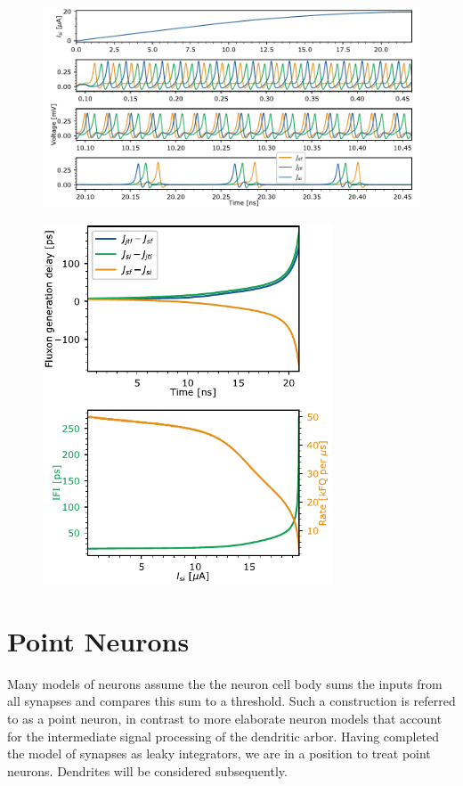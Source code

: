 \documentclass[twocolumn]{article}
\begin{document}
\begin{figure}[htb]
\includegraphics[width=17.2cm]{figures/_03__syn__fq_peaks.pdf}
\end{figure}

\begin{figure}[htb]
\includegraphics[width=8.6cm]{figures/_03__syn__fq_delay_and_rate.pdf}
\end{figure}

\section{\label{sec:point_neurons}Point Neurons}
Many models of neurons assume the the neuron cell body sums the inputs from all synapses and compares this sum to a threshold. Such a construction is referred to as a point neuron, in contrast to more elaborate neuron models that account for the intermediate signal processing of the dendritic arbor. Having completed the model of synapses as leaky integrators, we are in a position to treat point neurons. Dendrites will be considered subsequently.
\end{document}

